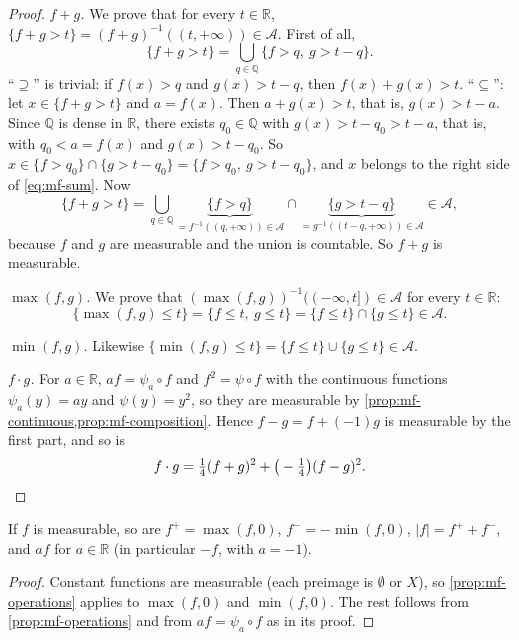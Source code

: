 \begin{proof}
\emph{$f+g$.} We prove that for every $t\in\mathbb R$,
$\{f+g>t\}=(f+g)^{-1}((t,+\infty))\in\mathcal A$. First of all,
\begin{equation}\label{eq:mf-sum}
  \{f+g>t\}=\bigcup_{q\in\mathbb Q}\{f>q,\ g>t-q\}.
\end{equation}
``$\supseteq$'' is trivial: if $f(x)>q$ and $g(x)>t-q$, then $f(x)+g(x)>t$. ``$\subseteq$'':
let $x\in\{f+g>t\}$ and $a=f(x)$. Then $a+g(x)>t$, that is, $g(x)>t-a$. Since $\mathbb Q$ is
dense in $\mathbb R$, there exists $q_0\in\mathbb Q$ with $g(x)>t-q_0>t-a$, that is, with
$q_0<a=f(x)$ and $g(x)>t-q_0$. So $x\in\{f>q_0\}\cap\{g>t-q_0\}=\{f>q_0,\ g>t-q_0\}$, and $x$
belongs to the right side of \eqref{eq:mf-sum}. Now
\[
  \{f+g>t\}=\bigcup_{q\in\mathbb Q}\underbrace{\{f>q\}}_{=f^{-1}((q,+\infty))\in\mathcal A}
  \cap\underbrace{\{g>t-q\}}_{=g^{-1}((t-q,+\infty))\in\mathcal A}\in\mathcal A,
\]
because $f$ and $g$ are measurable and the union is countable. So $f+g$ is measurable.

\emph{$\max(f,g)$.} We prove that $(\max(f,g))^{-1}((-\infty,t])\in\mathcal A$ for every
$t\in\mathbb R$:
\[
  \{\max(f,g)\le t\}=\{f\le t,\ g\le t\}=\{f\le t\}\cap\{g\le t\}\in\mathcal A .
\]

\emph{$\min(f,g)$.} Likewise $\{\min(f,g)\le t\}=\{f\le t\}\cup\{g\le t\}\in\mathcal A$.

\emph{$f\cdot g$.} For $a\in\mathbb R$, $af=\psi_a\circ f$ and $f^2=\psi\circ f$ with the
continuous functions $\psi_a(y)=ay$ and $\psi(y)=y^2$, so they are measurable by
\cref{prop:mf-continuous,prop:mf-composition}. Hence $f-g=f+(-1)g$ is measurable by the first
part, and so is
\[
  f\cdot g=\tfrac14(f+g)^2+\big(-\tfrac14\big)(f-g)^2 .\qedhere
\]
\end{proof}

\begin{corollary}\label{cor:mf-parts}
If $f$ is measurable, so are $f^+=\max(f,0)$, $f^-=-\min(f,0)$, $|f|=f^++f^-$, and $af$ for
$a\in\mathbb R$ (in particular $-f$, with $a=-1$).
\end{corollary}

\begin{proof}
Constant functions are measurable (each preimage is $\emptyset$ or $X$), so
\cref{prop:mf-operations} applies to $\max(f,0)$ and $\min(f,0)$. The rest follows from
\cref{prop:mf-operations} and from $af=\psi_a\circ f$ as in its proof.
\end{proof}

